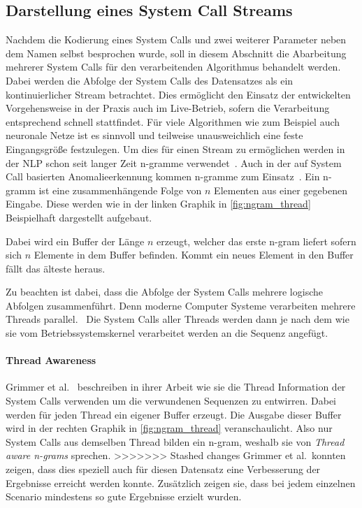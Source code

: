         \subsection{Darstellung eines System Call Streams}\label{sec:streamdarstellung}
            Nachdem die Kodierung eines System Calls und zwei weiterer Parameter neben dem Namen selbst besprochen wurde, soll in diesem Abschnitt die Abarbeitung mehrerer System Calls für den verarbeitenden Algorithmus behandelt werden.
            Dabei werden die Abfolge der System Calls des Datensatzes als ein kontinuierlicher Stream betrachtet.
            Dies ermöglicht den Einsatz der entwickelten Vorgehensweise in der Praxis auch im Live-Betrieb, sofern die Verarbeitung entsprechend schnell stattfindet.
            Für viele Algorithmen wie zum Beispiel auch neuronale Netze ist es sinnvoll und teilweise unausweichlich eine feste Eingangsgröße festzulegen.
            Um dies für einen Stream zu ermöglichen werden in der \ac{NLP} schon seit langer Zeit n-gramme verwendet~\cite{NGRAMSUEN1979}.
            Auch in der auf System Call basierten Anomalieerkennung kommen n-gramme zum Einsatz~\cite{STIDE_Alternatives, SYSCALL_GRAPHS, IDSTHREADGRIMMER2021}.
            Ein n-gramm ist eine zusammenhängende Folge von $n$ Elementen aus einer gegebenen Eingabe.
            Diese werden wie in der linken Graphik in \autoref{fig:ngram_thread} Beispielhaft dargestellt aufgebaut.

            Dabei wird ein Buffer der Länge $n$ erzeugt, welcher das erste n-gram liefert sofern sich $n$ Elemente in dem Buffer befinden.
            Kommt ein neues Element in den Buffer fällt das älteste heraus.

            Zu beachten ist dabei, dass die Abfolge der System Calls mehrere logische Abfolgen zusammenführt.
            Denn moderne Computer Systeme verarbeiten mehrere Threads parallel.~\cite{SYSCALL_SILBERSCHATZ}
            Die System Calls aller Threads werden dann je nach dem wie sie vom Betriebssystemskernel verarbeitet werden an die Sequenz angefügt.
            
            \paragraph{Thread Awareness}
                Grimmer et al.~\cite{IDSTHREADGRIMMER2021} beschreiben in ihrer Arbeit wie sie die Thread Information der System Calls verwenden um die verwundenen Sequenzen zu entwirren.
                Dabei werden für jeden Thread ein eigener Buffer erzeugt. 
                Die Ausgabe dieser Buffer wird in der rechten Graphik in \autoref{fig:ngram_thread} veranschaulicht. 
                Also nur System Calls aus demselben Thread bilden ein n-gram, weshalb sie von \textit{Thread aware n-grams} sprechen.
>>>>>>> Stashed changes
                Grimmer et al.\ konnten zeigen, dass dies speziell auch für diesen Datensatz eine Verbesserung der Ergebnisse erreicht werden konnte.
                Zusätzlich zeigen sie, dass bei jedem einzelnen Scenario mindestens so gute Ergebnisse erzielt wurden.


